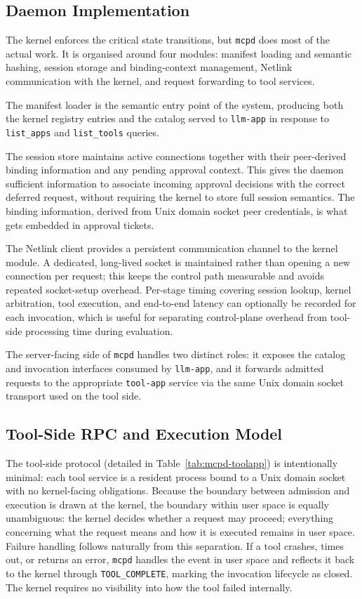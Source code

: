 \subsection{Daemon Implementation}

The kernel enforces the critical state transitions, but \texttt{mcpd} does most of the actual work.
It is organised around four modules: manifest loading and semantic hashing, session storage and binding-context management, Netlink communication with the kernel, and request forwarding to tool services.

The manifest loader is the semantic entry point of the system, producing both the kernel registry entries and the catalog served to \texttt{llm-app} in response to \texttt{list\_apps} and \texttt{list\_tools} queries.

The session store maintains active connections together with their peer-derived binding information and any pending approval context.
This gives the daemon sufficient information to associate incoming approval decisions with the correct deferred request, without requiring the kernel to store full session semantics.
The binding information, derived from Unix domain socket peer credentials, is what gets embedded in approval tickets.

The Netlink client provides a persistent communication channel to the kernel module.
A dedicated, long-lived socket is maintained rather than opening a new connection per request; this keeps the control path measurable and avoids repeated socket-setup overhead.
Per-stage timing covering session lookup, kernel arbitration, tool execution, and end-to-end latency can optionally be recorded for each invocation, which is useful for separating control-plane overhead from tool-side processing time during evaluation.

The server-facing side of \texttt{mcpd} handles two distinct roles: it exposes the catalog and invocation interfaces consumed by \texttt{llm-app}, and it forwards admitted requests to the appropriate \texttt{tool-app} service via the same Unix domain socket transport used on the tool side.



\subsection{Tool-Side RPC and Execution Model}

The tool-side protocol (detailed in Table~\ref{tab:mcpd-toolapp}) is intentionally minimal: each tool service is a resident process bound to a Unix domain socket with no kernel-facing obligations.
Because the boundary between admission and execution is drawn at the kernel, the boundary within user space is equally unambiguous: the kernel decides whether a request may proceed; everything concerning what the request means and how it is executed remains in user space.
Failure handling follows naturally from this separation.
If a tool crashes, times out, or returns an error, \texttt{mcpd} handles the event in user space and reflects it back to the kernel through \texttt{TOOL\_COMPLETE}, marking the invocation lifecycle as closed.
The kernel requires no visibility into how the tool failed internally.



